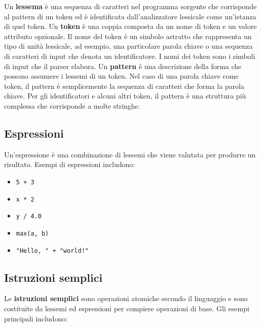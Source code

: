 \documentclass[
  letterpaper,
  DIV=11,
  numbers=noendperiod]{scrreprt}
\providecommand{\tightlist}{%
  \setlength{\itemsep}{0pt}\setlength{\parskip}{0pt}}\usepackage{longtable,booktabs,array}
\begin{document}
Un \textbf{lessema} è una sequenza di caratteri nel programma sorgente
che corrisponde al pattern di un token ed è identificata
dall'analizzatore lessicale come un'istanza di quel token. Un
\textbf{token} è una coppia composta da un nome di token e un valore
attributo opzionale. Il nome del token è un simbolo astratto che
rappresenta un tipo di unità lessicale, ad esempio, una particolare
parola chiave o una sequenza di caratteri di input che denota un
identificatore. I nomi dei token sono i simboli di input che il parser
elabora. Un \textbf{pattern} è una descrizione della forma che possono
assumere i lessemi di un token. Nel caso di una parola chiave come
token, il pattern è semplicemente la sequenza di caratteri che forma la
parola chiave. Per gli identificatori e alcuni altri token, il pattern è
una struttura più complessa che corrisponde a molte stringhe.

\subsection{Espressioni}\label{espressioni}

Un'espressione è una combinazione di lessemi che viene valutata per
produrre un risultato. Esempi di espressioni includono:

\begin{itemize}
\tightlist
\item
  \texttt{5\ +\ 3}
\item
  \texttt{x\ *\ 2}
\item
  \texttt{y\ /\ 4.0}
\item
  \texttt{max(a,\ b)}
\item
  \texttt{"Hello,\ "\ +\ "world!"}
\end{itemize}

\subsection{Istruzioni semplici}\label{istruzioni-semplici}

Le \textbf{istruzioni semplici} sono operazioni atomiche secondo il
linguaggio e sono costituite da lessemi ed espressioni per compiere
operazioni di base. Gli esempi principali includono:
\end{document}
